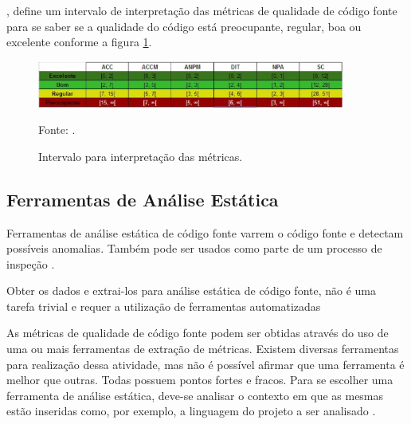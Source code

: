 , define um intervalo de interpretação das métricas de qualidade de código fonte para se saber se a qualidade do código está preocupante, regular, boa ou excelente conforme a figura \ref{intervalosMetricas}.

\begin{figure}[htp]
\centering
\includegraphics[width=0.9\textwidth]{figuras/intervalosMetricas}
\caption{Intervalo para interpretação das métricas.}{Fonte: .} 
\label{intervalosMetricas}
\end{figure}

\subsection{Ferramentas de Análise Estática}

Ferramentas de análise estática de código fonte varrem o código fonte e detectam possíveis anomalias. Também pode ser usados como parte de um processo de inspeção \cite[pág.~345]{sommerville}.

Obter os dados e extrai-los para análise estática de código fonte, não é uma tarefa trivial e requer a utilização de ferramentas automatizadas \cite[pág.~2]{meirelles2013}

As métricas de qualidade de código fonte podem ser obtidas através do uso de uma ou mais ferramentas de extração de métricas. Existem diversas ferramentas para realização dessa atividade, mas não é possível afirmar que uma ferramenta é melhor que outras. Todas possuem pontos fortes e fracos. Para se escolher uma ferramenta de análise estática, deve-se analisar o contexto em que as mesmas estão inseridas como, por exemplo, a linguagem do projeto a ser analisado \cite{millani2013}.
